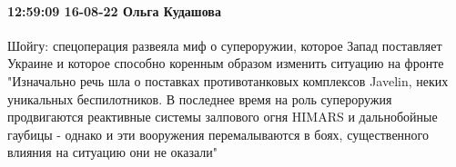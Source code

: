  
 
 
 
 

\paragraph{12:59:09 16-08-22 Ольга Кудашова}

\obeycr
Шойгу: спецоперация развеяла миф о супероружии, которое Запад поставляет Украине и которое способно коренным образом изменить ситуацию на фронте
"Изначально речь шла о поставках противотанковых комплексов Javelin, неких уникальных беспилотников. В последнее время на роль супероружия продвигаются реактивные системы залпового огня HIMARS и дальнобойные гаубицы - однако и эти вооружения перемалываются в боях, существенного влияния на ситуацию они не оказали"
\restorecr
